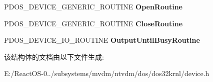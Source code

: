 \begin{DoxyCompactItemize}
P\+D\+O\+S\+\_\+\+D\+E\+V\+I\+C\+E\+\_\+\+G\+E\+N\+E\+R\+I\+C\+\_\+\+R\+O\+U\+T\+I\+NE {\bfseries Open\+Routine}
\item 
\mbox{\label{struct___d_o_s___d_e_v_i_c_e___n_o_d_e_aa76de6c37827476cc78cc2f8c94a52aa}} 
P\+D\+O\+S\+\_\+\+D\+E\+V\+I\+C\+E\+\_\+\+G\+E\+N\+E\+R\+I\+C\+\_\+\+R\+O\+U\+T\+I\+NE {\bfseries Close\+Routine}
\item 
\mbox{\label{struct___d_o_s___d_e_v_i_c_e___n_o_d_e_aafcede35d16bba29a6f698d8d14ff62f}} 
P\+D\+O\+S\+\_\+\+D\+E\+V\+I\+C\+E\+\_\+\+I\+O\+\_\+\+R\+O\+U\+T\+I\+NE {\bfseries Output\+Until\+Busy\+Routine}
\end{DoxyCompactItemize}


该结构体的文档由以下文件生成\+:\begin{DoxyCompactItemize}
\item 
E\+:/\+React\+O\+S-\/0../subsystems/mvdm/ntvdm/dos/dos32krnl/device.\+h\end{DoxyCompactItemize}
